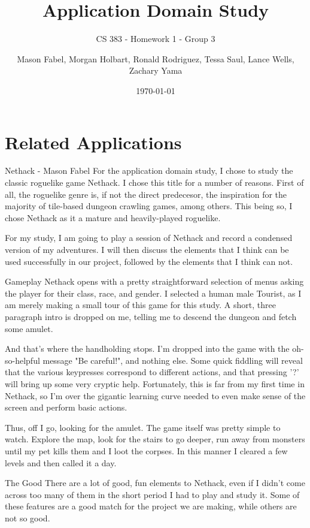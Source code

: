 \documentclass[12pt]{report}
\title{Application Domain Study}
\subtitle{CS 383 - Homework 1 - Group 3}
\author{Mason Fabel, Morgan Holbart, Ronald Rodriguez, Tessa Saul, Lance Wells, Zachary Yama}
\date{\today}
\begin{document}
\maketitle

\chapter{Related Applications}

\begin{section}{Nethack - Mason Fabel}
For the application domain study, I chose to study the classic roguelike
game Nethack. I chose this title for a number of reasons. First of all,
the roguelike genre is, if not the direct predecesor, the inspiration for
the majority of tile-based dungeon crawling games, among others. This being
so, I chose Nethack as it a mature and heavily-played roguelike.

For my study, I am going to play a session of Nethack and record a
condensed version of my adventures. I will then discuss the elements that
I think can be used successfully in our project, followed by the elements
that I think can not.

\begin{subsection}{Gameplay}
Nethack opens with a pretty straightforward selection of menus asking the
player for their class, race, and gender. I selected a human male Tourist,
as I am merely making a small tour of this game for this study. A short,
three paragraph intro is dropped on me, telling me to descend the
dungeon and fetch some amulet.

And that's where the handholding stops. I'm dropped into the game with the
oh-so-helpful message "Be careful!", and nothing else. Some quick fiddling
will reveal that the various keypresses correspond to different actions,
and that pressing '?' will bring up some very cryptic help. Fortunately,
this is far from my first time in Nethack, so I'm over the gigantic
learning curve needed to even make sense of the screen and perform basic
actions.

Thus, off I go, looking for the amulet. The game itself was pretty simple
to watch. Explore the map, look for the stairs to go deeper, run away from
monsters until my pet kills them and I loot the corpses. In this manner I
cleared a few levels and then called it a day.
\end{subsection}

\begin{subsection}{The Good}
There are a lot of good, fun elements to Nethack, even if I didn't come
across too many of them in the short period I had to play and study it.
Some of these features are a good match for the project we are making,
while others are not so good.


\end{subsection}
\end{section}
\end{document}
